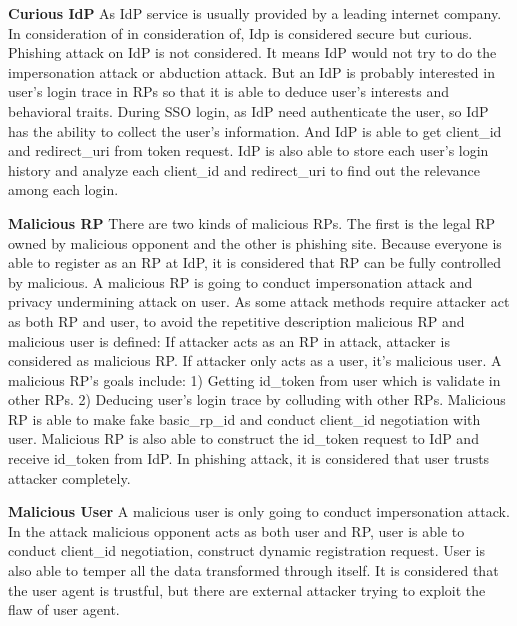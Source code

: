 \textbf{Curious IdP} As IdP service is usually provided by a leading internet company. In consideration of in consideration of, Idp is considered secure but curious. Phishing attack on IdP is not considered. It means IdP would not try to do the impersonation attack or abduction attack. But an IdP is probably interested in user's login trace in RPs so that it is able to deduce user's interests and behavioral traits. During SSO login, as IdP need authenticate the user, so IdP has the ability to collect the user's information. And IdP is able to get client\_id and redirect\_uri from token request. IdP is also able to store each user's login history and analyze each client\_id and redirect\_uri to find out the relevance among each login.


\textbf{Malicious RP} There are two kinds of malicious RPs. The first is the legal RP owned by malicious opponent and the other is phishing site. Because everyone is able to register as an RP at IdP, it is considered that RP can be fully controlled by malicious. A malicious RP is going to conduct impersonation attack and privacy undermining attack on user. As some attack methods require attacker act as both RP and user, to avoid the repetitive description malicious RP and malicious user is defined: If attacker acts as an RP in attack, attacker is considered as malicious RP. If attacker only acts as a user, it's malicious user. 
A malicious RP's goals include: 1) Getting id\_token from user which is validate in other RPs. 2) Deducing user's login trace by colluding with other RPs. 
Malicious RP is able to make fake basic\_rp\_id and conduct client\_id negotiation with user. Malicious RP is also able to construct the id\_token request to IdP and receive id\_token from IdP. In phishing attack, it is considered that user trusts attacker completely. 


\textbf{Malicious User} A malicious user is only going to conduct impersonation attack. In the attack malicious opponent acts as both user and RP, user is able to conduct client\_id negotiation, construct dynamic registration request. User is also able to temper all the data transformed through itself. It is considered that the user agent is trustful, but there are external attacker trying to exploit the flaw of user agent.





